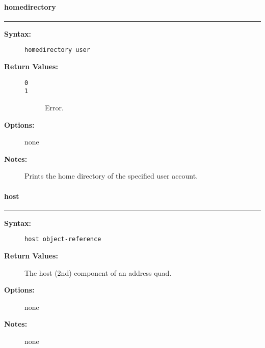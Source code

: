 \vspace {2pt}


\paragraph{homedirectory}

\hrule
\begin{description}
\item[{\bf Syntax:}] \mbox{}

{\tt homedirectory user}

\item[{\bf Return Values:}] \mbox{}

\begin{description}
\item[{\tt 0}] \mbox{}



\item[{\tt 1}] \mbox{}

Error.

\end{description}


\item[{\bf Options:}] \mbox{}

none  

\item[{\bf Notes:}] \mbox{}

Prints the home directory of the specified 
user account.

\end{description}


\vspace {2pt}


\paragraph{host}

\hrule
\begin{description}
\item[{\bf Syntax:}] \mbox{}

{\tt host object-reference}

\item[{\bf Return Values:}] \mbox{}

The host (2nd) component of an 
address quad.

\item[{\bf Options:}] \mbox{}

none  

\item[{\bf Notes:}] \mbox{}

none  

\end{description}


